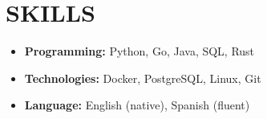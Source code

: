 \section*{SKILLS}
\begin{itemize}
  \item \textbf{Programming:} Python, Go, Java, SQL, Rust
  \item \textbf{Technologies:} Docker, PostgreSQL, Linux, Git
  \item \textbf{Language:} English (native), Spanish (fluent)
\end{itemize}
